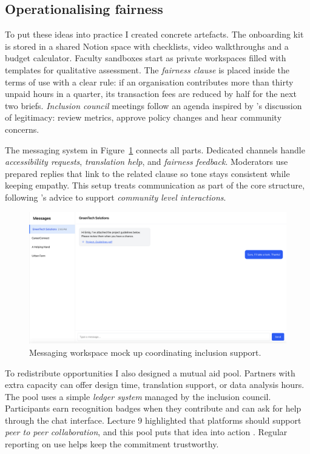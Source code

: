 \subsection*{Operationalising fairness}
To put these ideas into practice I created concrete artefacts. The onboarding kit is stored in a shared Notion space with checklists, video walkthroughs and a budget calculator. Faculty sandboxes start as private workspaces filled with templates for qualitative assessment. The \textit{fairness clause} is placed inside the terms of use with a clear rule: if an organisation contributes more than thirty unpaid hours in a quarter, its transaction fees are reduced by half for the next two briefs. \textit{Inclusion council} meetings follow an agenda inspired by \citet{Lecture11}'s discussion of legitimacy: review metrics, approve policy changes and hear community concerns.

The messaging system in Figure~\ref{fig:chat-system} connects all parts. Dedicated channels handle \textit{accessibility requests}, \textit{translation help}, and \textit{fairness feedback}. Moderators use prepared replies that link to the related clause so tone stays consistent while keeping empathy. This setup treats communication as part of the core structure, following \citet{Choudary2016}'s advice to support \textit{community level interactions}.

\begin{figure}[H]
  \centering
  \includegraphics[width=0.85\linewidth]{figures/Messengersystem.png}
  \caption{Messaging workspace mock up coordinating inclusion support.}
  \label{fig:chat-system}
\end{figure}

To redistribute opportunities I also designed a mutual aid pool. Partners with extra capacity can offer design time, translation support, or data analysis hours. The pool uses a simple \textit{ledger system} managed by the inclusion council. Participants earn recognition badges when they contribute and can ask for help through the chat interface. Lecture 9 highlighted that platforms should support \textit{peer to peer collaboration}, and this pool puts that idea into action \citep{Lecture09}. Regular reporting on use helps keep the commitment trustworthy.
